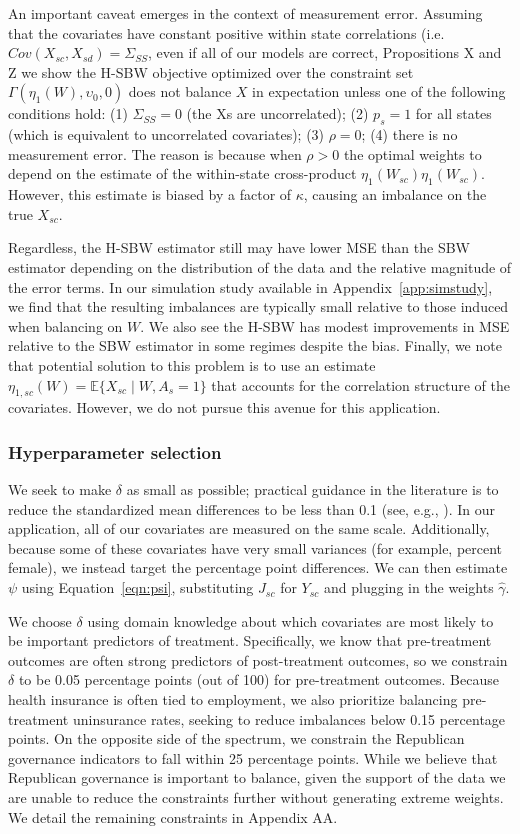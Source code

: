 \documentclass[aoas]{imsart}
\theoremstyle{plain}
\theoremstyle{remark}
\begin{document}
An important caveat emerges in the context of measurement error. Assuming that the covariates have constant positive within state correlations (i.e. $Cov(X_{sc}, X_{sd}) = \Sigma_{SS}$, even if all of our models are correct, Propositions X and Z we show the H-SBW objective optimized over the constraint set $\Gamma(\eta_1(W), \upsilon_0, 0)$ does not balance $X$ in expectation unless one of the following conditions hold: (1) $\Sigma_{SS} = 0$ (the Xs are uncorrelated); (2) $p_s = 1$ for all states (which is equivalent to uncorrelated covariates); (3) $\rho = 0$; (4) there is no measurement error. The reason is because when $\rho > 0$ the optimal weights to depend on the estimate of the within-state cross-product $\eta_1(W_{sc})\eta_1(W_{sc})$. However, this estimate is biased by a factor of $\kappa$, causing an imbalance on the true $X_{sc}$.

Regardless, the H-SBW estimator still may have lower MSE than the SBW estimator depending on the distribution of the data and the relative magnitude of the error terms. In our simulation study available in Appendix~\ref{app:simstudy}, we find that the resulting imbalances are typically small relative to those induced when balancing on $W$. We also see the H-SBW has modest improvements in MSE relative to the SBW estimator in some regimes despite the bias. Finally, we note that potential solution to this problem is to use an estimate $\eta_{1, sc}(W) = \mathbb{E}\{X_{sc} \mid W, A_s = 1\}$ that accounts for the correlation structure of the covariates. However, we do not pursue this avenue for this application.

\subsubsection{Hyperparameter selection}

We seek to make $\delta$ as small as possible; practical guidance in the literature is to reduce the standardized mean differences to be less than 0.1 (see, e.g., \cite{zhang2019balance}). In our application, all of our covariates are measured on the same scale. Additionally, because some of these covariates have very small variances (for example, percent female), we instead target the percentage point differences. We can then estimate $\psi$ using Equation~\ref{eqn:psi}, substituting $J_{sc}$ for $Y_{sc}$ and plugging in the weights $\hat{\gamma}$.

We choose $\delta$ using domain knowledge about which covariates are most likely to be important predictors of treatment. Specifically, we know that pre-treatment outcomes are often strong predictors of post-treatment outcomes, so we constrain $\delta$ to be 0.05 percentage points (out of 100) for pre-treatment outcomes. Because health insurance is often tied to employment, we also prioritize balancing pre-treatment uninsurance rates, seeking to reduce imbalances below 0.15 percentage points. On the opposite side of the spectrum, we constrain the Republican governance indicators to fall within 25 percentage points. While we believe that Republican governance is important to balance, given the support of the data we are unable to reduce the constraints further without generating extreme weights. We detail the remaining constraints in Appendix AA. 
\end{document}
